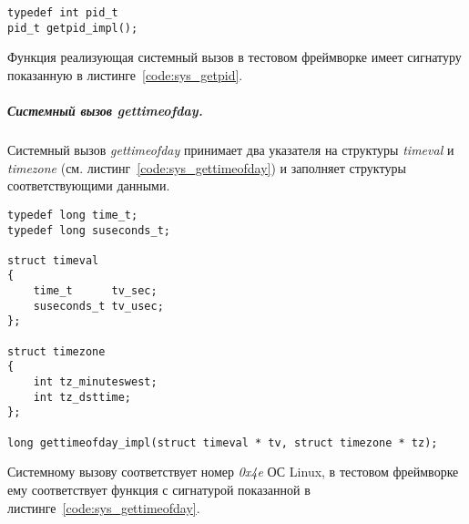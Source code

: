 \begin{lstlisting}[caption=Сигнатура функции getpid, label=code:sys_getpid]
typedef int pid_t
pid_t getpid_impl();
\end{lstlisting}

Функция реализующая системный вызов в тестовом фреймворке имеет сигнатуру показанную в листинге~\ref{code:sys_getpid}.

\subparagraph{Системный вызов gettimeofday.}

Системный вызов \textit{gettimeofday} принимает два указателя на структуры \textit{timeval} и \textit{timezone} (см. листинг~\ref{code:sys_gettimeofday}) и заполняет структуры соответствующими данными.

\begin{lstlisting}[caption=Сигнатура функции gettimeofday, label=code:sys_gettimeofday]
typedef long time_t;
typedef long suseconds_t;

struct timeval
{
    time_t      tv_sec;
    suseconds_t tv_usec;
};

struct timezone
{
    int tz_minuteswest;
    int tz_dsttime;
};

long gettimeofday_impl(struct timeval * tv, struct timezone * tz);
\end{lstlisting}

Системному вызову соответствует номер \textit{0x4e} ОС Linux, в тестовом фреймворке ему соответствует функция с сигнатурой показанной в листинге~\ref{code:sys_gettimeofday}.

